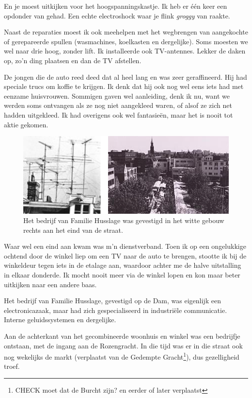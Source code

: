 \documentclass[12pt,twoside, openright]{memoir}
\begin{document}
En je moest uitkijken voor het hoogspanningskastje. Ik heb er één keer een opdonder van gehad. Een echte electroshock waar je flink \emph{groggy} van raakte.

Naast de reparaties moest ik ook meehelpen met het wegbrengen van aangekochte of gerepareerde spullen (wasmachines, koelkasten en dergelijke). Soms moesten we wel naar drie hoog, zonder lift. Ik installeerde ook TV-antennes. Lekker de daken op, zo’n ding plaatsen en dan de TV afstellen. 

De jongen die de auto reed deed dat al heel lang en was zeer geraffineerd. Hij had speciale trucs om koffie te krijgen. Ik denk dat hij ook nog wel eens iets had met eenzame huisvrouwen. Sommigen gaven wel aanleiding, denk ik nu, want we werden soms ontvangen als ze nog niet aangekleed waren, of alsof ze zich net hadden uitgekleed. Ik had overigens ook wel fantasieën, maar het is nooit tot aktie gekomen. 

\begin{figure}
\includegraphics[width=\textwidth]{img/ch32/antennae}
\caption*{\footnotesize Het bedrijf van Familie Husslage was gevestigd in het witte gebouw rechts aan het eind van de straat.}
\end{figure}

Waar wel een eind aan kwam was m’n dienstverband. Toen ik op een ongelukkige ochtend door de winkel liep om een TV naar de auto te brengen, stootte ik bij de winkeldeur tegen iets in de etalage aan, waardoor achter me de halve uitstalling in elkaar donderde. Ik mocht nooit meer via de winkel lopen en kon maar beter uitkijken naar een andere baas.

Het bedrijf van Familie Husslage, gevestigd op de Dam, was eigenlijk een electronicazaak, maar had zich gespecialiseerd in industriële communicatie. Interne geluidssystemen en dergelijke. 

Aan de achterkant van het gecombineerde woonhuis en winkel was een bedrijfje ontstaan, met de ingang aan de Rozengracht. In die tijd was er in die straat ook nog wekelijks de markt (verplaatst van de Gedempte Gracht\footnote{CHECK moet dat de Burcht zijn? en eerder of later verplaatst}), dus gezelligheid troef. 
\end{document}
